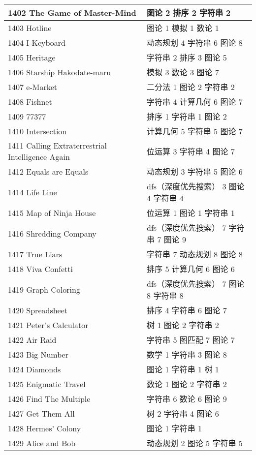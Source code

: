 \begin{longtable}{| p{} | p{} |}
 1402 The Game of Master-Mind  & 图论 2 排序 2 字符串 2 \\ \hline
 1403 Hotline  & 图论 1 模拟 1 数论 1 \\ \hline
 1404 I-Keyboard  & 动态规划 4 字符串 6 图论 8 \\ \hline
 1405 Heritage  & 字符串 2 排序 3 图论 5 \\ \hline
 1406 Starship Hakodate-maru  & 模拟 3 数论 3 图论 7 \\ \hline
 1407 e-Market  & 二分法 1 图论 2 字符串 2 \\ \hline
 1408 Fishnet  & 字符串 4 计算几何 6 图论 7 \\ \hline
 1409 77377  & 排序 1 字符串 1 图论 2 \\ \hline
 1410 Intersection  & 计算几何 5 字符串 5 图论 7 \\ \hline
 1411 Calling Extraterrestrial Intelligence Again  & 位运算 3 字符串 4 图论 7 \\ \hline
 1412 Equals are Equals  & 动态规划 3 字符串 5 图论 6 \\ \hline
 1414 Life Line  & dfs（深度优先搜索） 3 图论 4 字符串 4 \\ \hline
 1415 Map of Ninja House  & 位运算 1 图论 1 字符串 1 \\ \hline
 1416 Shredding Company  & dfs（深度优先搜索） 7 字符串 7 图论 9 \\ \hline
 1417 True Liars  & 字符串 7 动态规划 8 图论 8 \\ \hline
 1418 Viva Confetti  & 排序 5 计算几何 6 图论 6 \\ \hline
 1419 Graph Coloring  & dfs（深度优先搜索） 7 图论 8 字符串 8 \\ \hline
 1420 Spreadsheet  & 排序 4 字符串 6 图论 7 \\ \hline
 1421 Peter's Calculator  & 树 1 图论 2 字符串 2 \\ \hline
 1422 Air Raid  & 字符串 5 图匹配 7 图论 7 \\ \hline
 1423 Big Number  & 数学 1 字符串 3 图论 8 \\ \hline
 1424 Diamonds  & 图论 1 字符串 1 树 1 \\ \hline
 1425 Enigmatic Travel  & 数论 1 图论 2 字符串 2 \\ \hline
 1426 Find The Multiple  & 字符串 6 数论 6 图论 9 \\ \hline
 1427 Get Them All  & 树 2 字符串 4 图论 6 \\ \hline
 1428 Hermes' Colony  & 图论 1 字符串 1 \\ \hline
 1429 Alice and Bob  & 动态规划 2 图论 5 字符串 5 \\ \hline

\end{longtable}
